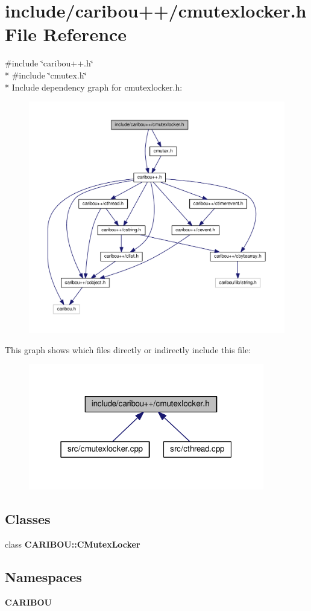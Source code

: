 \section{include/caribou++/cmutexlocker.h File Reference}
\label{cmutexlocker_8h}
{\ttfamily \#include \char`\"{}caribou++.\+h\char`\"{}}\\*
{\ttfamily \#include \char`\"{}cmutex.\+h\char`\"{}}\\*
Include dependency graph for cmutexlocker.\+h\+:
\nopagebreak
\begin{figure}[H]
\begin{center}
\leavevmode
\includegraphics[width=350pt]{cmutexlocker_8h__incl}
\end{center}
\end{figure}
This graph shows which files directly or indirectly include this file\+:
\nopagebreak
\begin{figure}[H]
\begin{center}
\leavevmode
\includegraphics[width=292pt]{cmutexlocker_8h__dep__incl}
\end{center}
\end{figure}
\subsection*{Classes}
\begin{DoxyCompactItemize}
\item 
class {\bf C\+A\+R\+I\+B\+O\+U\+::\+C\+Mutex\+Locker}
\end{DoxyCompactItemize}
\subsection*{Namespaces}
\begin{DoxyCompactItemize}
\item 
 {\bf C\+A\+R\+I\+B\+OU}
\end{DoxyCompactItemize}
